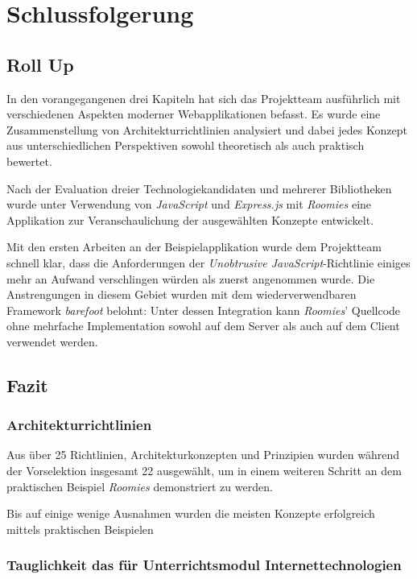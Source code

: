 \chapter{Schlussfolgerung}

\section*{Roll Up}
In den vorangegangenen drei Kapiteln hat sich das Projektteam ausführlich mit verschiedenen Aspekten moderner Webapplikationen befasst. Es wurde eine Zusammenstellung von Architekturrichtlinien analysiert und dabei jedes Konzept aus unterschiedlichen Perspektiven sowohl theoretisch als auch praktisch bewertet.

Nach der Evaluation dreier Technologiekandidaten und mehrerer Bibliotheken wurde unter Verwendung von \emph{JavaScript} und \emph{Express.js} mit \emph{Roomies} eine Applikation zur Veranschaulichung der ausgewählten Konzepte entwickelt.

Mit den ersten Arbeiten an der Beispielapplikation wurde dem Projektteam schnell klar, dass die Anforderungen der \emph{Unobtrusive JavaScript}-Richtlinie einiges mehr an Aufwand verschlingen würden als zuerst angenommen wurde. Die Anstrengungen in diesem Gebiet wurden mit dem wiederverwendbaren Framework \emph{barefoot} belohnt: Unter dessen Integration kann \emph{Roomies}' Quellcode ohne mehrfache Implementation sowohl auf dem Server als auch auf dem Client verwendet werden.


\section*{Fazit}

\subsection*{Architekturrichtlinien}
Aus über 25 Richtlinien, Architekturkonzepten und Prinzipien wurden während der Vorselektion insgesamt 22 ausgewählt, um in einem weiteren Schritt an dem praktischen Beispiel \emph{Roomies} demonstriert zu werden.

Bis auf einige wenige Ausnahmen wurden die meisten Konzepte erfolgreich mittels praktischen Beispielen


\subsection*{Tauglichkeit das für Unterrichtsmodul Internettechnologien}



